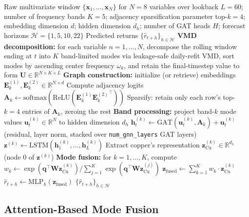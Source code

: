 \documentclass[journal]{IEEEtran}
\begin{document}
\begin{algorithm}[!t]
\caption{VMD-MFGNN forward pass}
\label{alg:vmdmfgnn}
\begin{algorithmic}[1]
\Require Raw multivariate window $\{\mathbf{x}_1,\ldots,\mathbf{x}_N\}$ for $N=8$ variables over lookback $L=60$; number of frequency bands $K=5$; adjacency sparsification parameter top-$k=4$; embedding dimension $d$; hidden dimension $d_h$; number of GAT heads $H$; forecast horizons $\mathcal{H}=\{1,5,10,22\}$
\Ensure Predicted returns $\{\hat{r}_{t+h}\}_{h\in\mathcal{H}}$
\State \textbf{VMD decomposition:} for each variable $n=1,\ldots,N$, decompose the rolling window ending at $t$ into $K$ band-limited modes via leakage-safe daily-refit VMD, sort modes by ascending center frequency $\omega_k$, and retain the final-timestep value to form $\mathbf{U} \in \mathbb{R}^{N \times K \times L}$
    \State \textbf{Graph construction:} initialize (or retrieve) embeddings $\mathbf{E}^{(1)}_k, \mathbf{E}^{(2)}_k \in \mathbb{R}^{N \times d}$
    \State Compute adjacency logits $\mathbf{A}_k \leftarrow \text{softmax}(\text{ReLU}(\mathbf{E}^{(1)}_k {\mathbf{E}^{(2)}_k}^\top))$
    \State Sparsify: retain only each row's top-$k=4$ entries of $\mathbf{A}_k$, zeroing the rest
    \State \textbf{Band processing:} project band-$k$ mode values $\mathbf{u}^{(k)}_t \in \mathbb{R}^N$ to hidden dimension $d_h$
        \State $\mathbf{h}^{(k)}_{t} \leftarrow \text{GAT}(\mathbf{u}^{(k)}_{t}, \mathbf{A}_k) + \mathbf{u}^{(k)}_{t}$ (residual, layer norm, stacked over \texttt{num\_gnn\_layers} GAT layers)
    \EndFor
    \State $\mathbf{z}^{(k)} \leftarrow \text{LSTM}(\mathbf{h}^{(k)}_{1}, \ldots, \mathbf{h}^{(k)}_{L})$
    \State Extract copper's representation $\mathbf{z}^{(k)}_{\text{Cu}} \in \mathbb{R}^{d_h}$ (node 0 of $\mathbf{z}^{(k)}$)
\EndFor
\State \textbf{Mode fusion:} for $k=1,\ldots,K$, compute $w_k \leftarrow \exp(\mathbf{q}^\top \mathbf{W}\mathbf{z}^{(k)}_{\text{Cu}}) / \sum_{j=1}^{K} \exp(\mathbf{q}^\top \mathbf{W}\mathbf{z}^{(j)}_{\text{Cu}})$
\State $\mathbf{z}_{\text{fused}} \leftarrow \sum_{k=1}^{K} w_k \cdot \mathbf{z}^{(k)}_{\text{Cu}}$
    \State $\hat{r}_{t+h} \leftarrow \text{MLP}_h(\mathbf{z}_{\text{fused}})$
\EndFor
\State \Return $\{\hat{r}_{t+h}\}_{h\in\mathcal{H}}$
\end{algorithmic}
\end{algorithm}

\subsection{Attention-Based Mode Fusion}
\end{document}
